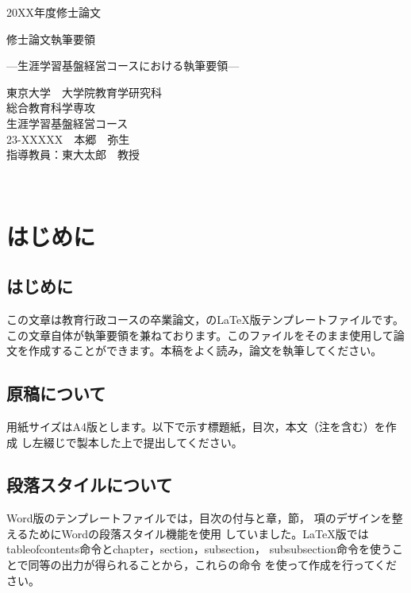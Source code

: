 \documentclass[a4paper,11pt,oneside,openany]{jsbook}
\begin{document}
\thispagestyle{empty}
\large
20XX年度修士論文
\bigskip\bigskip\bigskip\bigskip\bigskip\bigskip\bigskip
\LARGE %
\begin{center}
修士論文執筆要領
\end{center}
\Large %
\begin{center}
---生涯学習基盤経営コースにおける執筆要領---
\end{center}
\bigskip\bigskip\bigskip\bigskip\bigskip\bigskip\bigskip\bigskip\bigskip\bigskip
\bigskip\bigskip\bigskip\bigskip\bigskip\bigskip\bigskip\bigskip\bigskip
\normalsize %
\begin{center}
東京大学　大学院教育学研究科\\
総合教育科学専攻\\
生涯学習基盤経営コース\\
23-XXXXX　本郷　弥生\\
指導教員：東大太郎　教授
\end{center}
\normalsize
\newpage
\thispagestyle{empty}
　
\newpage
\setcounter{page}{0}

\thispagestyle{empty}
\tableofcontents
\newpage

\setcounter{page}{1}

\chapter{はじめに}
\thispagestyle{empty}
\section{はじめに}
この文章は教育行政コースの卒業論文，の\LaTeX{}版テンプレートファイルです。
この文章自体が執筆要領を兼ねております。このファイルをそのまま使用して論
文を作成することができます。本稿をよく読み，論文を執筆してください。


\section{原稿について}
用紙サイズはA4版とします。以下で示す標題紙，目次，本文（注を含む）を作成
し左綴じで製本した上で提出してください。

\section{段落スタイルについて}
Word\textregistered{}版のテンプレートファイルでは，目次の付与と章，節，
項のデザインを整えるためにWord\textregistered{}の段落スタイル機能を使用
していました。\LaTeX{}版ではtableofcontents命令とchapter，section，subsection，
subsubsection命令を使うことで同等の出力が得られることから，これらの命令
を使って作成を行ってください。
\end{document}
